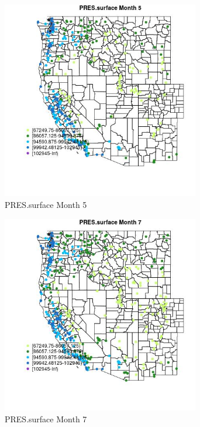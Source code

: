 \begin{figure} 
\centering  
\includegraphics[width=0.77\textwidth]{Code_Outputs/Report_ML_input_PM25_Step4_part_e_de_duplicated_aves_compiled_2019-05-18wNAs_MapObsMo5PRESsurface.jpg} 
\caption{\label{fig:Report_ML_input_PM25_Step4_part_e_de_duplicated_aves_compiled_2019-05-18wNAsMapObsMo5PRESsurface}PRES.surface Month 5} 
\end{figure} 
 

\begin{figure} 
\centering  
\includegraphics[width=0.77\textwidth]{Code_Outputs/Report_ML_input_PM25_Step4_part_e_de_duplicated_aves_compiled_2019-05-18wNAs_MapObsMo7PRESsurface.jpg} 
\caption{\label{fig:Report_ML_input_PM25_Step4_part_e_de_duplicated_aves_compiled_2019-05-18wNAsMapObsMo7PRESsurface}PRES.surface Month 7} 
\end{figure} 
 

